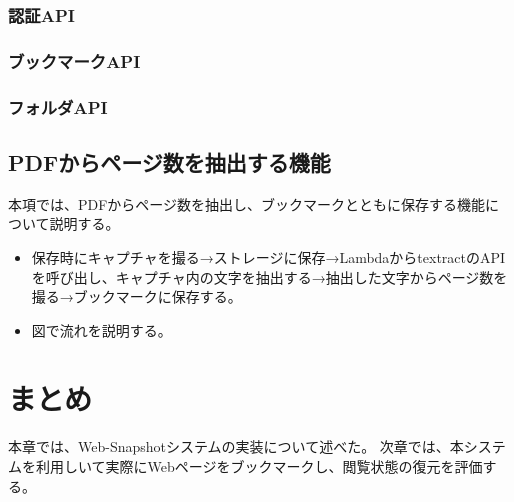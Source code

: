 \subsubsection{認証API}
\subsubsection{ブックマークAPI}
\subsubsection{フォルダAPI}

\subsection{PDFからページ数を抽出する機能}
本項では、PDFからページ数を抽出し、ブックマークとともに保存する機能について説明する。

\begin{itemize}
  \item 保存時にキャプチャを撮る→ストレージに保存→LambdaからtextractのAPIを呼び出し、キャプチャ内の文字を抽出する→抽出した文字からページ数を撮る→ブックマークに保存する。
  \item 図で流れを説明する。
\end{itemize}

\section{まとめ}
本章では、Web-Snapshotシステムの実装について述べた。
次章では、本システムを利用しいて実際にWebページをブックマークし、閲覧状態の復元を評価する。